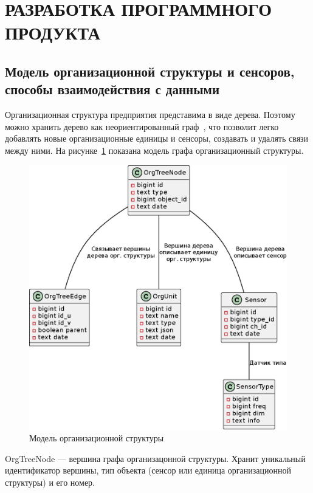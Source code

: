 \section{РАЗРАБОТКА ПРОГРАММНОГО ПРОДУКТА}

\subsection{Модель организационной структуры и сенсоров, способы взаимодействия с данными}

Организационная структура предприятия представима в виде дерева. Поэтому можно хранить дерево как неориентированный граф~\cite{graphs}, что позволит легко добавлять новые организационные единицы и сенсоры, создавать и удалять связи между ними. На рисунке~\ref{datamodel} показана модель графа организационный структуры.

\begin{figure}
  \includegraphics[scale=1.0]{img/datamodel.eps}
  \caption{Модель организационной структуры}
  \label{datamodel}
\end{figure}

OrgTreeNode --- вершина графа организацонной структуры. Хранит уникальный идентификатор вершины, тип объекта (сенсор или единица организационной структуры) и его номер.

